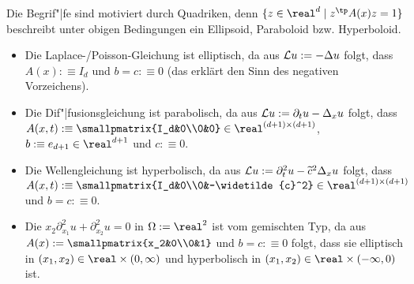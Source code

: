 \begin{Bem}
    Die Begrif"|fe sind motiviert durch Quadriken,
    denn $\{z \in \real^d \;|\; z^\tp A(x) z = 1\}$ beschreibt unter obigen Bedingungen
    ein Ellipsoid, Paraboloid bzw. Hyperboloid.
\end{Bem}

\begin{Bsp}
    \begin{itemize}
        \item
        Die Laplace-/Poisson-Gleichung ist elliptisch, da aus $\mathcal{L} u := -\Delta u$ folgt,
        dass $A(x) :\equiv I_d$ und $b = c :\equiv 0$
        (das erklärt den Sinn des negativen Vorzeichens).

        \item
        Die Dif"|fusionsgleichung ist parabolisch, da aus $\mathcal{L} u := \partial_t u - \Delta_x u$
        folgt, dass\\
        $A(x, t) :\equiv \smallpmatrix{I_d&0\\0&0} \in \real^{(d+1)\times(d+1)}$,
        $b :\equiv e_{d+1} \in \real^{d+1}$ und $c :\equiv 0$.

        \item
        Die Wellengleichung ist hyperbolisch, da aus
        $\mathcal{L} u := \partial_t^2 u - \widetilde{c}^2 \Delta_x u$ folgt, dass\\
        $A(x, t) :\equiv \smallpmatrix{I_d&0\\0&-\widetilde{c}^2} \in \real^{(d+1)\times(d+1)}$ und
        $b = c :\equiv 0$.

        \item
        Die  $x_2 \partial_{x_1}^2 u + \partial_{x_2}^2 u = 0$
        in $\Omega := \real^2$ ist vom gemischten Typ, da aus $A(x) := \smallpmatrix{x_2&0\\0&1}$
        und $b = c :\equiv 0$ folgt, dass sie
        elliptisch in $(x_1, x_2) \in \real \times (0, \infty)$ und
        hyperbolisch in $(x_1, x_2) \in \real \times (-\infty, 0)$ ist.
    \end{itemize}
\end{Bsp}

\linie

